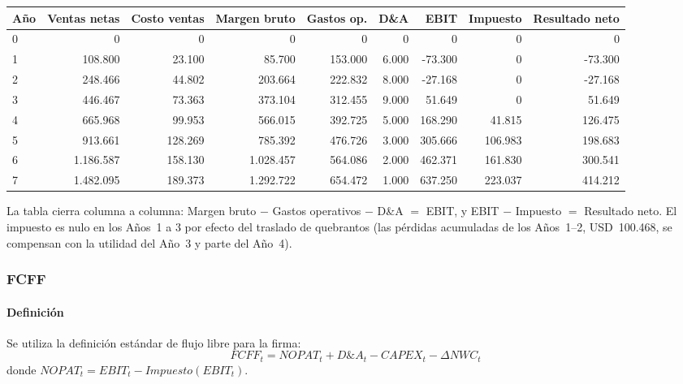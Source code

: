 \begin{center}
\label{tab:is_churn}
\footnotesize
\begin{adjustbox}{width=\textwidth,center}
\begin{tabular}{lrrrrrrrr}
\toprule
\textbf{Año} & \textbf{Ventas netas} & \textbf{Costo ventas} & \textbf{Margen bruto} & \textbf{Gastos op.} & \textbf{D\&A} & \textbf{EBIT} & \textbf{Impuesto} & \textbf{Resultado neto} \\
\midrule
0 & 0 & 0 & 0 & 0 & 0 & 0 & 0 & 0 \\
1 & 108.800 & 23.100 & 85.700 & 153.000 & 6.000 & -73.300 & 0 & -73.300 \\
2 & 248.466 & 44.802 & 203.664 & 222.832 & 8.000 & -27.168 & 0 & -27.168 \\
3 & 446.467 & 73.363 & 373.104 & 312.455 & 9.000 & 51.649 & 0 & 51.649 \\
4 & 665.968 & 99.953 & 566.015 & 392.725 & 5.000 & 168.290 & 41.815 & 126.475 \\
5 & 913.661 & 128.269 & 785.392 & 476.726 & 3.000 & 305.666 & 106.983 & 198.683 \\
6 & 1.186.587 & 158.130 & 1.028.457 & 564.086 & 2.000 & 462.371 & 161.830 & 300.541 \\
7 & 1.482.095 & 189.373 & 1.292.722 & 654.472 & 1.000 & 637.250 & 223.037 & 414.212 \\
\bottomrule
\end{tabular}
\end{adjustbox}
\end{center}

\noindent La tabla cierra columna a columna: Margen bruto $-$ Gastos operativos $-$ D\&A $=$ EBIT, y EBIT $-$ Impuesto $=$ Resultado neto. El impuesto es nulo en los Años~1 a 3 por efecto del traslado de quebrantos (las pérdidas acumuladas de los Años~1--2, USD~100.468, se compensan con la utilidad del Año~3 y parte del Año~4).

\subsubsection{FCFF}

\paragraph{Definición}
Se utiliza la definición estándar de flujo libre para la firma:
\[
FCFF_t = NOPAT_t + D\&A_t - CAPEX_t - \Delta NWC_t
\]
donde $NOPAT_t = EBIT_t - Impuesto(EBIT_t)$.


